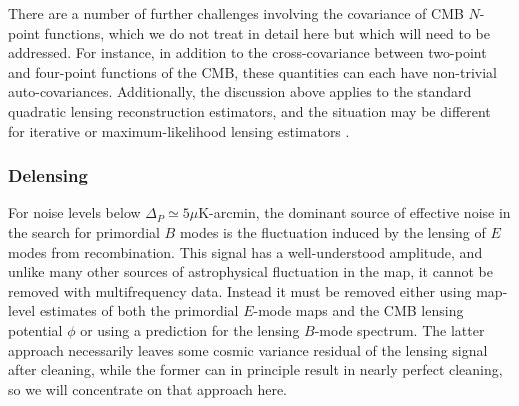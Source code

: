 There are a number of further challenges involving the covariance of CMB $N$-point functions, which 
we do not treat in detail here but which will need to be addressed. For instance,
in addition to the cross-covariance between two-point and four-point functions of the CMB, these quantities can each have non-trivial auto-covariances.  
Additionally, the discussion above applies to the standard quadratic lensing reconstruction estimators, and the situation may be different for iterative or maximum-likelihood lensing estimators \cite{Hirata:2002jy}.

\subsubsection{Delensing}
For noise levels below $\Delta_P \simeq 5 \mu$K-arcmin,  the dominant source of effective noise in the search for primordial $B$ modes is the fluctuation induced by the lensing of $E$ modes from recombination.  This signal has a well-understood amplitude, and unlike many other sources of astrophysical fluctuation in the map, it cannot be removed with multifrequency data.  Instead it must be removed either using map-level estimates of both the primordial $E$-mode maps and the CMB lensing potential $\phi$ or using a prediction for the lensing $B$-mode spectrum. The latter approach necessarily leaves some cosmic variance residual of the lensing signal after cleaning, while the former can in principle result in nearly perfect cleaning, so we will concentrate on that approach here.


